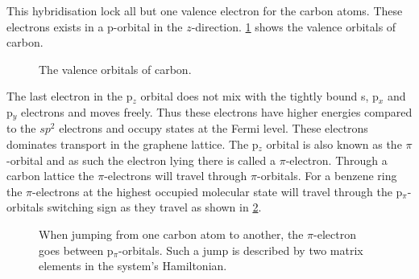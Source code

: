 \vspace{-2\baselineskip}
This hybridisation lock all but one valence electron for the carbon atoms. These electrons exists in a p-orbital in the \(z\)-direction.
\cref{p} shows the valence orbitals of carbon.
\begin{figure}[H]
	\begin{center}
		\caption{The valence orbitals of carbon.}
		\label{p}
	\end{center}
\end{figure}
The last electron in the p\(_z\) orbital does not mix with the tightly bound s, p\(_x\) and p\(_y\) electrons and moves freely. Thus these electrons have higher energies compared to the \(sp^2\) electrons and occupy states at the Fermi level. These electrons dominates transport in the graphene lattice. The p\(_z\) orbital is also known as the \(\pi\)-orbital and as such the electron lying there is called a \(\pi\)-electron. Through a carbon lattice the \(\pi\)-electrons will travel through \(\pi\)-orbitals. For a benzene ring the \(\pi\)-electrons at the highest occupied molecular state will travel through the p\(_\pi\)-orbitals switching sign as they travel as shown in \cref{sign}.
\begin{figure}[H]
	\begin{center}
		\caption{When jumping from one carbon atom to another, the \(\pi\)-electron goes between p\(_\pi\)-orbitals. Such a jump is described by two matrix elements in the system's Hamiltonian.}
		\label{sign}
	\end{center}
\end{figure}

